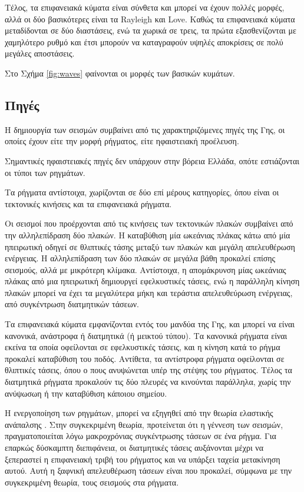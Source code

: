 Τέλος, τα επιφανειακά κύματα είναι σύνθετα και μπορεί να έχουν πολλές μορφές, αλλά οι δύο βασικότερες είναι τα Rayleigh και Love. Καθώς τα επιφανειακά κύματα μεταδίδονται σε δύο διαστάσεις, ενώ τα χωρικά σε τρεις, τα πρώτα εξασθενίζονται με χαμηλότερο ρυθμό και έτσι μπορούν να καταγραφούν υψηλές αποκρίσεις σε πολύ μεγάλες αποστάσεις. \parencite{Stein}

Στο Σχήμα \ref{fig:waves} φαίνονται οι μορφές των βασικών κυμάτων.

\subsection{Πηγές}
\label{sbs:Source}

Η δημιουργία των σεισμών συμβαίνει από τις χαρακτηριζόμενες πηγές της Γης, οι οποίες έχουν είτε την μορφή ρήγματος, είτε ηφαιστειακή προέλευση.

Σημαντικές ηφαιστειακές πηγές δεν υπάρχουν στην βόρεια Ελλάδα, οπότε εστιάζονται οι τύποι των ρηγμάτων.

Τα ρήγματα αντίστοιχα, χωρίζονται σε δύο επί μέρους κατηγορίες, όπου είναι οι τεκτονικές κινήσεις και τα επιφανειακά ρήγματα.

Οι σεισμοί που προέρχονται από τις κινήσεις των τεκτονικών πλακών συμβαίνει από την αλληλεπίδραση δύο πλακών. Η καταβύθιση μία ωκεάνιας πλάκας κάτω από μία ηπειρωτική οδηγεί σε θλιπτικές τάσης μεταξύ των πλακών και μεγάλη απελευθέρωση ενέργειας. Η αλληλεπίδραση των δύο πλακών σε μεγάλα βάθη προκαλεί επίσης σεισμούς, αλλά με μικρότερη κλίμακα. Αντίστοιχα, η απομάκρυνση μίας ωκεάνιας πλάκας από μια ηπειρωτική δημιουργεί εφελκυστικές τάσεις, ενώ η παράλληλη κίνηση πλακών μπορεί να έχει τα μεγαλύτερα μήκη και τεράστια απελευθεύρωση ενέργειας, από συγκέντρωση διατμητικών τάσεων.

Τα επιφανειακά κύματα εμφανίζονται εντός του μανδύα της Γης, και μπορεί να είναι κανονικά, ανάστροφα ή διατμητικά (ή μεικτού τύπου). Τα κανονικά ρήγματα είναι εκείνα τα οποία οφείλονται σε εφελκυστικές τάσεις, και η κίνηση κατά το ρήγμα προκαλεί καταβύθιση του ποδός. Αντίθετα, τα αντίστροφα ρήγματα οφείλονται σε θλιπτικές τάσεις, όπου ο πους ανυψώνεται υπέρ της στέψης του ρήγματος. Τέλος τα διατμητικά ρήγματα προκαλούν τις δύο πλευρές να κινούνται παράλληλα, χωρίς την ανύψωσωη ή την καταβύθιση κάποιου σημείου. \parencite{YuHu}

Η ενεργοποίηση των ρηγμάτων, μπορεί να εξηγηθεί από την θεωρία ελαστικής ανάπαλσης \parencite{Reid}. Στην συγκεκριμένη θεωρία, προτείνεται ότι η γέννεση των σεισμών, πραγματοποιείται λόγω μακροχρόνιας συγκέντρωσης τάσεων σε ένα ρήγμα. Για επαρκώς δύσκαμπτη διεπιφάνεια, οι διατμητικές τάσεις αυξάνονται μέχρι να ξεπεραστεί η επιφανειακή τριβή του ρήγματος και να υπάρξει ταχεία μετακίνηση αυτού. Αυτή η ξαφνική απελευθέρωση τάσεων είναι που προκαλεί, σύμφωνα με την συγκεκριμένη θεωρία, τους σεισμούς στα ρήγματα.

